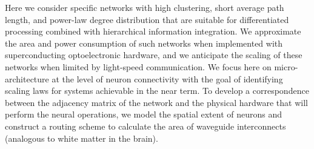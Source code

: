 \documentclass[twocolumn]{article}
\begin{document}
Here we consider specific networks with high clustering, short average path length, and power-law degree distribution that are suitable for differentiated processing combined with hierarchical information integration. We approximate the area and power consumption of such networks when implemented with superconducting optoelectronic hardware, and we anticipate the scaling of these networks when limited by light-speed communication. We focus here on micro-architecture at the level of neuron connectivity with the goal of identifying scaling laws for systems achievable in the near term. To develop a correspondence between the adjacency matrix of the network \cite{eskn2015} and the physical hardware that will perform the neural operations, we model the spatial extent of neurons and construct a routing scheme to calculate the area of waveguide interconnects (analogous to white matter in the brain).
	
\end{document}
